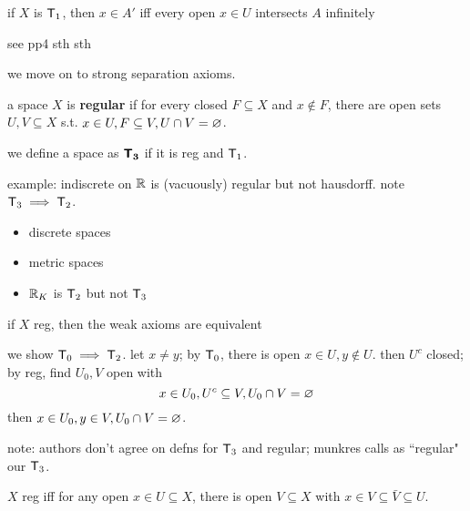 \begin{prop}
    if $X$ is $\mathsf{T}_{1}$, then $x\in A'$ iff every open $x\in U$ intersects
    $A$ infinitely
\end{prop}
see pp4 sth sth

we move on to strong separation axioms.

\begin{defn}
    a space $X$ is \textbf{regular} if for every closed $F\subseteq X$ and
    $x\notin F$, there are open sets $U,V\subseteq X$ s.t. $x\in U,F\subseteq V,
    U\cap V=\varnothing$.

    we define a space as $\bm{\mathsf{T}_{3}}$ if it is reg and $\mathsf{T}_{1}$.
\end{defn}
example: indiscrete on $\mathbb{R}$ is (vacuously) regular but not hausdorff.
note $\mathsf{T}_{3}\implies\mathsf{T}_{2}$.

\newpage
\begin{xmp}[source=Primary Source Material]
    \vspace{-0.35in}
    \begin{itemize}
        \item discrete spaces
        \item metric spaces
        \item $\mathbb{R}_{K}$ is $\mathsf{T}_{2}$ but not $\mathsf{T}_{3}$
    \end{itemize}
\end{xmp}

\begin{prop}
    if $X$ reg, then the weak axioms are equivalent
\end{prop}

\begin{pf}[source=Primary Source Material]
    we show $\mathsf{T}_{0}\implies\mathsf{T}_{2}$.
    let $x\neq y$; by $\mathsf{T}_{0}$, there is open $x\in U,y\notin U$.
    then $U^{c}$ closed; by reg, find $U_{0},V$ open with
    \begin{equation*}
        x\in U_{0},U^{c}\subseteq V,U_{0}\cap V=\varnothing
    \end{equation*}
    then $x\in U_{0},y\in V, U_{0}\cap V=\varnothing$.
\end{pf}
note: authors don't agree on defns for $\mathsf{T}_{3}$ and regular; munkres calls
as ``regular" our $\mathsf{T}_{3}$.

\begin{prop}
    $X$ reg iff for any open $x\in U\subseteq X$, there is open $V\subseteq X$
    with $x\in V\subseteq\bar{V}\subseteq U$.
\end{prop}


